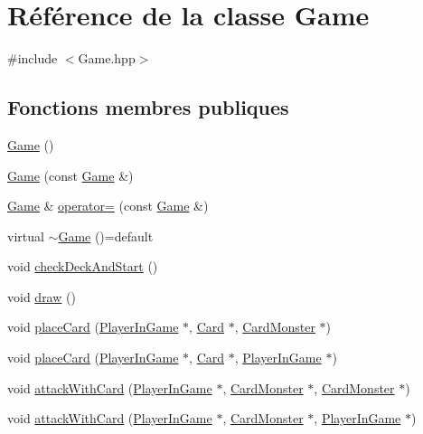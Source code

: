\hypertarget{classGame}{}\section{Référence de la classe Game}
\label{classGame}


{\ttfamily \#include $<$Game.\+hpp$>$}

\subsection*{Fonctions membres publiques}
\begin{DoxyCompactItemize}
\item 
\hyperlink{classGame_ad59df6562a58a614fda24622d3715b65}{Game} ()
\item 
\hyperlink{classGame_aa79443880de5f26387c2a1c70c8c1aae}{Game} (const \hyperlink{classGame}{Game} \&)
\item 
\hyperlink{classGame}{Game} \& \hyperlink{classGame_aec1439ca4c76f4a002c235134d590158}{operator=} (const \hyperlink{classGame}{Game} \&)
\item 
virtual \hyperlink{classGame_ab0556d428e8db075b405355af7e81dae}{$\sim$\+Game} ()=default
\item 
void \hyperlink{classGame_a41a8233a0473e2e3687d0380c9b2bccb}{check\+Deck\+And\+Start} ()
\item 
void \hyperlink{classGame_a6d54497ce3a66f6dd45eacfdccc8d0bd}{draw} ()
\item 
void \hyperlink{classGame_a407f859fd79905d6b868de21748123fb}{place\+Card} (\hyperlink{classPlayerInGame}{Player\+In\+Game} $\ast$, \hyperlink{classCard}{Card} $\ast$, \hyperlink{classCardMonster}{Card\+Monster} $\ast$)
\item 
void \hyperlink{classGame_a78b7006c16663d938285c7fd28e6db6b}{place\+Card} (\hyperlink{classPlayerInGame}{Player\+In\+Game} $\ast$, \hyperlink{classCard}{Card} $\ast$, \hyperlink{classPlayerInGame}{Player\+In\+Game} $\ast$)
\item 
void \hyperlink{classGame_ab0de361fcd868ab41245535447f128ec}{attack\+With\+Card} (\hyperlink{classPlayerInGame}{Player\+In\+Game} $\ast$, \hyperlink{classCardMonster}{Card\+Monster} $\ast$, \hyperlink{classCardMonster}{Card\+Monster} $\ast$)
\item 
void \hyperlink{classGame_aea86730a90afb69330ef43d1115a6a4f}{attack\+With\+Card} (\hyperlink{classPlayerInGame}{Player\+In\+Game} $\ast$, \hyperlink{classCardMonster}{Card\+Monster} $\ast$, \hyperlink{classPlayerInGame}{Player\+In\+Game} $\ast$)
\end{DoxyCompactItemize}
